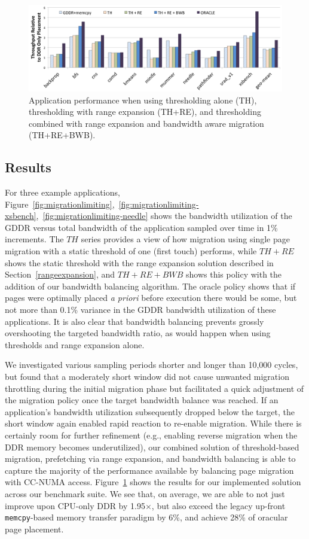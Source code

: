 \begin{figure}[thp]
    \includegraphics[width=\textwidth]{hpca2015/figures/final.png}
    \caption{Application performance when using thresholding alone (TH), thresholding with range expansion (TH+RE), and thresholding combined with range expansion and bandwidth aware migration (TH+RE+BWB).}
    \label{fig:final}
\end{figure}

\subsection{Results}
For three example applications,
Figure~\ref{fig:migrationlimiting},~\ref{fig:migrationlimiting-xsbench},~\ref{fig:migrationlimiting-needle}
shows the bandwidth utilization of the GDDR versus total bandwidth of the application sampled over time
in 1\% increments.  The $TH$ series provides a view of how migration using single page
migration with a static threshold of one (first touch) performs, while $TH+RE$ shows the static threshold with the range expansion
solution described in Section~\ref{rangeexpansion}, and $TH+RE+BWB$ shows this policy with the addition of our
bandwidth balancing algorithm.  The oracle policy shows that if pages were optimally placed \emph{a priori} before execution there would be some,
but not more than 0.1\% variance in the GDDR bandwidth utilization of these applications.  It is also clear that
bandwidth balancing prevents grossly overshooting the targeted bandwidth ratio, as would happen when using thresholds and range expansion alone.

We investigated various sampling periods shorter and longer than 10,000 cycles, but
found that a moderately short window did not cause unwanted migration throttling during the initial
migration phase but facilitated a quick adjustment of the migration policy once the target bandwidth balance was reached.
If an application's bandwidth utilization subsequently dropped below the target, the short window again enabled rapid
reaction to re-enable migration.   While there is certainly room for further refinement (e.g., enabling 
reverse migration when the DDR memory becomes underutilized), our combined solution of threshold-based migration, prefetching via range expansion, and bandwidth balancing is able to capture the majority of the performance available by balancing page migration
with CC-NUMA access.  Figure~\ref{fig:final} shows the results for our implemented solution across
our benchmark suite.  We see that, on average, we are able to not just improve
upon CPU-only DDR by 1.95$\times$,
but also exceed the legacy up-front {\tt memcpy}-based memory transfer paradigm by 6\%,
and achieve 28\% of oracular page placement.

